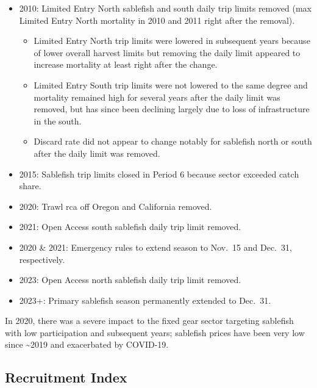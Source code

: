 \documentclass[
  english,
]{article}
\providecommand{\tightlist}{%
  \setlength{\itemsep}{0pt}\setlength{\parskip}{0pt}}
\begin{document}
\begin{itemize}
\tightlist
\item
  2010: Limited Entry North sablefish and south daily trip limits
  removed (max Limited Entry North mortality in 2010 and 2011 right
  after the removal).

  \begin{itemize}
  \tightlist
  \item
    Limited Entry North trip limits were lowered in subsequent years
    because of lower overall harvest limits but removing the daily limit
    appeared to increase mortality at least right after the change.
  \item
    Limited Entry South trip limits were not lowered to the same degree
    and mortality remained high for several years after the daily limit
    was removed, but has since been declining largely due to loss of
    infrastructure in the south.
  \item
    Discard rate did not appear to change notably for sablefish north or
    south after the daily limit was removed.
  \end{itemize}
\item
  2015: Sablefish trip limits closed in Period 6 because sector exceeded
  catch share.
\item
  2020: Trawl \gls{rca} off Oregon and California removed.
\item
  2021: Open Access south sablefish daily trip limit removed.
\item
  2020 \& 2021: Emergency rules to extend season to Nov.~15 and Dec.~31,
  respectively.
\item
  2023: Open Access north sablefish daily trip limit removed.
\item
  2023+: Primary sablefish season permanently extended to Dec.~31.
\end{itemize}

In 2020, there was a severe impact to the fixed gear sector targeting
sablefish with low participation and subsequent years; sablefish prices
have been very low since \textasciitilde2019 and exacerbated by
COVID-19.

\subsection{Recruitment Index}\label{rec-appendix}
\end{document}
